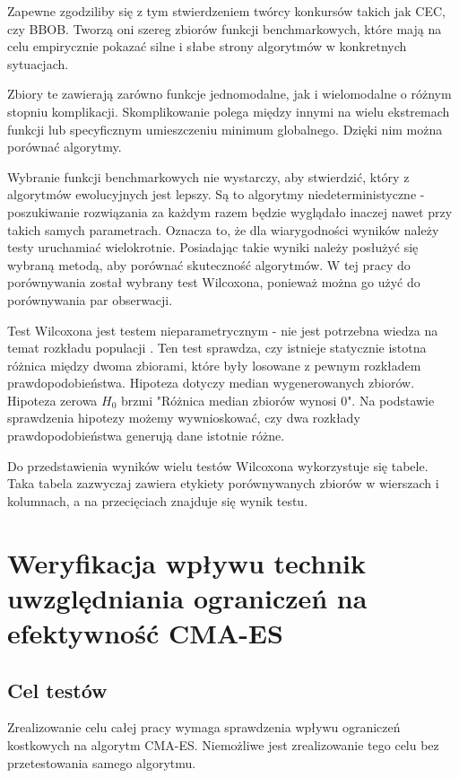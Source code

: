 \documentclass{mini}
\newcommand{\CMAES}{\mbox{CMA-ES}}
\begin{document}
Zapewne zgodziliby się z tym stwierdzeniem twórcy konkursów takich jak CEC, czy BBOB. Tworzą oni szereg zbiorów funkcji benchmarkowych, które mają na celu empirycznie pokazać silne i słabe strony algorytmów w konkretnych sytuacjach.

Zbiory te zawierają zarówno funkcje jednomodalne, jak i wielomodalne o różnym stopniu komplikacji. Skomplikowanie polega między innymi na wielu ekstremach funkcji lub specyficznym umieszczeniu minimum globalnego. Dzięki nim można porównać algorytmy.

Wybranie funkcji benchmarkowych nie wystarczy, aby stwierdzić, który z algorytmów ewolucyjnych jest lepszy. Są to algorytmy niedeterministyczne - poszukiwanie rozwiązania za każdym razem będzie wyglądało inaczej nawet przy takich samych parametrach. Oznacza to, że dla wiarygodności wyników należy testy uruchamiać wielokrotnie. Posiadając takie wyniki należy posłużyć się wybraną metodą, aby porównać skuteczność algorytmów. W tej pracy do porównywania został wybrany test Wilcoxona, ponieważ można go użyć do porównywania par obserwacji.

Test Wilcoxona jest testem nieparametrycznym - nie jest potrzebna wiedza na temat rozkładu populacji \cite{wilcox}. Ten test sprawdza, czy istnieje statycznie istotna różnica między dwoma zbiorami, które były losowane z pewnym rozkładem prawdopodobieństwa. Hipoteza dotyczy median wygenerowanych zbiorów. Hipoteza zerowa $H_0$ brzmi "Różnica median zbiorów wynosi 0". Na podstawie sprawdzenia hipotezy możemy wywnioskować, czy dwa rozkłady prawdopodobieństwa generują dane istotnie różne.

Do przedstawienia wyników wielu testów Wilcoxona wykorzystuje się tabele. Taka tabela zazwyczaj zawiera etykiety porównywanych zbiorów w wierszach i kolumnach, a na przecięciach znajduje się wynik testu.

\pagebreak

\section{Weryfikacja wpływu technik uwzględniania ograniczeń na efektywność CMA-ES}

\subsection{Cel testów}
\hspace{3,4ex}Zrealizowanie celu całej pracy wymaga sprawdzenia wpływu ograniczeń kostkowych na algorytm \CMAES. Niemożliwe jest zrealizowanie tego celu bez przetestowania samego algorytmu.
\end{document}
